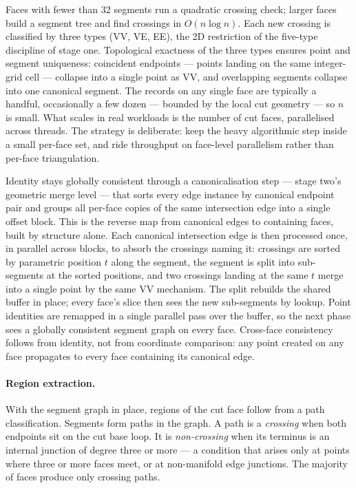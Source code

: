 \documentclass{egpubl}
\begin{document}
Faces with fewer than 32 segments run a quadratic crossing check; larger faces build a segment tree and find crossings in $O(n \log n)$. Each new crossing is classified by three types (VV, VE, EE), the 2D restriction of the five-type discipline of stage one. Topological exactness of the three types ensures point and segment uniqueness: coincident endpoints --- points landing on the same integer-grid cell --- collapse into a single point as VV, and overlapping segments collapse into one canonical segment. The records on any single face are typically a handful, occasionally a few dozen --- bounded by the local cut geometry --- so $n$ is small. What scales in real workloads is the number of cut faces, parallelised across threads. The strategy is deliberate: keep the heavy algorithmic step inside a small per-face set, and ride throughput on face-level parallelism rather than per-face triangulation.

Identity stays globally consistent through a canonicalisation step --- stage two's geometric merge level --- that sorts every edge instance by canonical endpoint pair and groups all per-face copies of the same intersection edge into a single offset block. This is the reverse map from canonical edges to containing faces, built by structure alone. Each canonical intersection edge is then processed once, in parallel across blocks, to absorb the crossings naming it: crossings are sorted by parametric position $t$ along the segment, the segment is split into sub-segments at the sorted positions, and two crossings landing at the same $t$ merge into a single point by the same VV mechanism. The split rebuilds the shared buffer in place; every face's slice then sees the new sub-segments by lookup. Point identities are remapped in a single parallel pass over the buffer, so the next phase sees a globally consistent segment graph on every face. Cross-face consistency follows from identity, not from coordinate comparison: any point created on any face propagates to every face containing its canonical edge.

\paragraph*{Region extraction.}
With the segment graph in place, regions of the cut face follow from a path classification. Segments form paths in the graph. A path is a \emph{crossing} when both endpoints sit on the cut base loop. It is \emph{non-crossing} when its terminus is an internal junction of degree three or more --- a condition that arises only at points where three or more faces meet, or at non-manifold edge junctions. The majority of faces produce only crossing paths.
\end{document}
